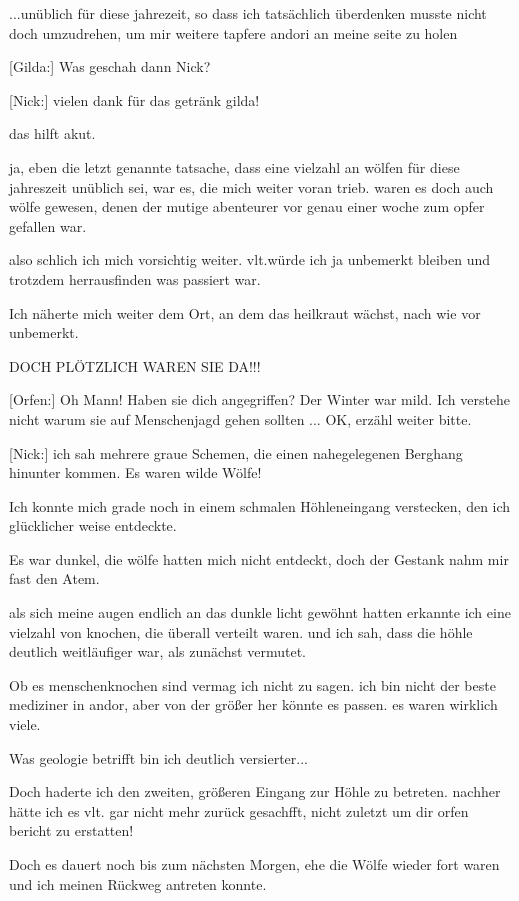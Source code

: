 \documentclass[10pt, a4paper, oneside]{book}
\begin{document}
\begin{multicols}{2}
...unüblich für diese jahrezeit, so dass ich tatsächlich überdenken musste nicht doch umzudrehen, um mir weitere tapfere andori an meine seite zu holen

[Gilda:] Was geschah dann Nick?

[Nick:] vielen dank für das getränk gilda!

das hilft akut.

ja, eben die letzt genannte tatsache, dass eine vielzahl an wölfen für diese jahreszeit unüblich sei, war es, die mich weiter voran trieb. waren es doch auch wölfe gewesen, denen der mutige abenteurer vor genau einer woche zum opfer gefallen war.

also schlich ich mich vorsichtig weiter. vlt.würde ich ja unbemerkt bleiben und trotzdem herrausfinden was passiert war.

Ich näherte mich weiter dem Ort, an dem das heilkraut wächst, nach wie vor unbemerkt.

DOCH PLÖTZLICH WAREN SIE DA!!!

[Orfen:] Oh Mann! Haben sie dich angegriffen? Der Winter war mild. Ich verstehe nicht warum sie auf Menschenjagd gehen sollten ... OK, erzähl weiter bitte.

[Nick:] ich sah mehrere graue Schemen, die einen nahegelegenen Berghang hinunter kommen. Es waren wilde Wölfe!

Ich konnte mich grade noch in einem schmalen Höhleneingang verstecken, den ich glücklicher weise entdeckte.

Es war dunkel, die wölfe hatten mich nicht entdeckt, doch der Gestank nahm mir fast den Atem.

als sich meine augen endlich an das dunkle licht gewöhnt hatten erkannte ich eine vielzahl von knochen, die überall verteilt waren. und ich sah, dass die höhle deutlich weitläufiger war, als zunächst vermutet.

Ob es menschenknochen sind vermag ich nicht zu sagen. ich bin nicht der beste mediziner in andor, aber von der größer her könnte es passen. es waren wirklich viele.

Was geologie betrifft bin ich deutlich versierter...

Doch haderte ich den zweiten, größeren Eingang zur Höhle zu betreten. nachher hätte ich es vlt. gar nicht mehr zurück gesachfft, nicht zuletzt um dir orfen bericht zu erstatten!

Doch es dauert noch bis zum nächsten Morgen, ehe die Wölfe wieder fort waren und ich meinen Rückweg antreten konnte.


\end{multicols}
\end{document}
